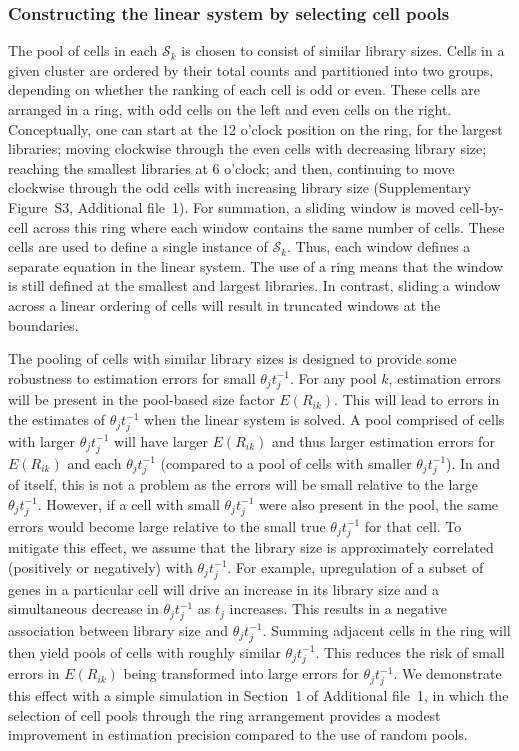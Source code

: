 \documentclass{bmcart}
\newcommand{\supppoolsim}{1}
\newcommand{\suppring}{S3}
\newcommand{\revised}[1]{#1}
\begin{document}
\subsubsection*{Constructing the linear system by selecting cell pools}
The pool of cells in each $\mathcal{S}_{k}$ is chosen to consist of similar library sizes.
Cells in a given cluster are ordered by their total counts and partitioned into two groups, depending on whether the ranking of each cell is odd or even.
These cells are arranged in a ring, with odd cells on the left and even cells on the right.
Conceptually, one can start at the 12 o'clock position on the ring, for the largest libraries; moving clockwise through the even cells with decreasing library size;
reaching the smallest libraries at 6 o'clock; and then, continuing to move clockwise through the odd cells with increasing library size (Supplementary Figure~\suppring{}, Additional file~1).
For summation, a sliding window is moved cell-by-cell across this ring where each window contains the same number of cells.
These cells are used to define a single instance of $\mathcal{S}_{k}$.
Thus, each window defines a separate equation in the linear system.
The use of a ring means that the window is still defined at the smallest and largest libraries.
In contrast, sliding a window across a linear ordering of cells will result in truncated windows at the boundaries.

The pooling of cells with similar library sizes is designed to provide some robustness to estimation errors for small $\theta_j t_j^{-1}$.
For any pool $k$, estimation errors will be present in the pool-based size factor $E(R_{ik})$.
This will lead to errors in the estimates of $\theta_j t_j^{-1}$ when the linear system is solved.
A pool comprised of cells with larger $\theta_j t_j^{-1}$ will have larger $E(R_{ik})$ and thus larger estimation errors for $E(R_{ik})$ and each $\theta_j t_j^{-1}$ (compared to a pool of cells with smaller $\theta_j t_j^{-1}$).
In and of itself, this is not a problem as the errors will be small relative to the large $\theta_j t_j^{-1}$.
However, if a cell with small $\theta_j t_j^{-1}$ were also present in the pool, the same errors would become large relative to the small true $\theta_j t_j^{-1}$ for that cell.
To mitigate this effect, we assume that the library size is approximately correlated (positively or negatively) with $\theta_j t_j^{-1}$.
For example, upregulation of a subset of genes in a particular cell will drive an increase in its library size and a simultaneous decrease in $\theta_j t_j^{-1}$ as $t_j$ increases.
This results in a negative association between library size and $\theta_j t_j^{-1}$.
Summing adjacent cells in the ring will then yield pools of cells with roughly similar $\theta_j t_j^{-1}$.
This reduces the risk of small errors in $E(R_{ik})$ being transformed into large errors for $\theta_j t_j^{-1}$.
\revised{We demonstrate this effect with a simple simulation in Section~\supppoolsim{} of Additional file~1, in which the selection of cell pools through the ring arrangement provides a modest improvement in estimation precision compared to the use of random pools.}
\end{document}
